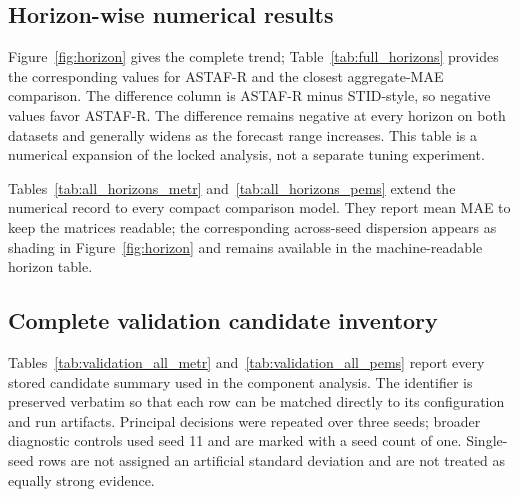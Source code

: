 \documentclass[fleqn,10pt]{wlscirep}
\newenvironment{changedcontent}{\color{changeblue}}{}
\begin{document}
\begin{changedcontent}
\subsection{Horizon-wise numerical results}
Figure~\ref{fig:horizon} gives the complete trend; Table~\ref{tab:full_horizons}
provides the corresponding values for ASTAF-R and the closest aggregate-MAE
comparison. The difference column is ASTAF-R minus STID-style, so negative
values favor ASTAF-R. The difference remains negative at every horizon on
both datasets and generally widens as the forecast range increases. This
table is a numerical expansion of the locked analysis, not a separate tuning
experiment.
\begin{table}[t]
\centering
\caption{Locked-test horizon-wise MAE in mph for ASTAF-R and the closest
aggregate-MAE compact control. Values are mean$\pm$sample standard deviation
across seeds 11, 22, and 33.}
\label{tab:full_horizons}
\small

\end{table}

Tables~\ref{tab:all_horizons_metr} and~\ref{tab:all_horizons_pems}
extend the numerical record to every compact comparison model. They report
mean MAE to keep the matrices readable; the corresponding across-seed
dispersion appears as shading in Figure~\ref{fig:horizon} and remains
available in the machine-readable horizon table.

\begin{table}[p]
\centering
\caption{METR-LA locked-test mean MAE at all 12 horizons for every compact
common-code model. GWN denotes Graph WaveNet-style, Trans. denotes
Transformer-style, and Persist. denotes persistence.}
\label{tab:all_horizons_metr}
\scriptsize
\resizebox{\textwidth}{!}{}
\end{table}

\begin{table}[p]
\centering
\caption{PeMS-BAY locked-test mean MAE at all 12 horizons for every compact
common-code model. Abbreviations follow Table~\ref{tab:all_horizons_metr}.}
\label{tab:all_horizons_pems}
\scriptsize
\resizebox{\textwidth}{!}{}
\end{table}

\subsection{Complete validation candidate inventory}
Tables~\ref{tab:validation_all_metr} and~\ref{tab:validation_all_pems}
report every stored candidate summary used in the component analysis. The
identifier is preserved verbatim so that each row can be matched directly to
its configuration and run artifacts. Principal decisions were repeated over
three seeds; broader diagnostic controls used seed 11 and are marked with a
seed count of one. Single-seed rows are not assigned an artificial standard
deviation and are not treated as equally strong evidence.


\end{changedcontent}
\end{document}
